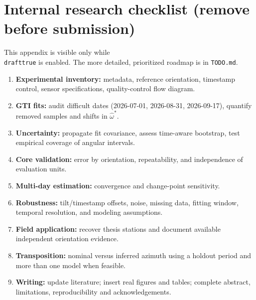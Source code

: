 \section{Internal research checklist (remove before submission)}
This appendix is visible only while \texttt{\\drafttrue} is enabled. The
more detailed, prioritized roadmap is in \texttt{TODO.md}.
\begin{enumerate}[leftmargin=*,label=\textbf{\arabic*.}]
\item \textbf{Experimental inventory:} metadata, reference orientation,
  timestamp control, sensor specifications, quality-control flow diagram.
\item \textbf{GTI fits:} audit difficult dates (2026-07-01, 2026-08-31,
  2026-09-17), quantify removed samples and shifts in $\hat\omega^{*}$.
\item \textbf{Uncertainty:} propagate fit covariance, assess time-aware
  bootstrap, test empirical coverage of angular intervals.
\item \textbf{Core validation:} error by orientation, repeatability, and
  independence of evaluation units.
\item \textbf{Multi-day estimation:} convergence and change-point sensitivity.
\item \textbf{Robustness:} tilt/timestamp offsets, noise, missing data,
  fitting window, temporal resolution, and modeling assumptions.
\item \textbf{Field application:} recover thesis stations and document
  available independent orientation evidence.
\item \textbf{Transposition:} nominal versus inferred azimuth using a
  holdout period and more than one model when feasible.
\item \textbf{Writing:} update literature; insert real figures and tables;
  complete abstract, limitations, reproducibility and acknowledgements.
\end{enumerate}
